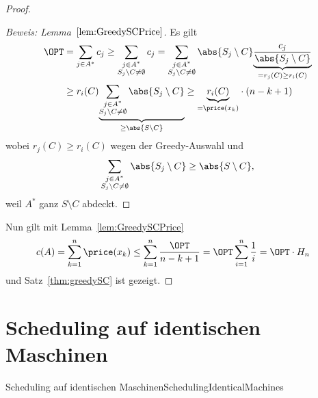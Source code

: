 \documentclass[language=ngerman,algolist]{TemplateLecture}
\begin{document}
\begin{proof}
\begin{proof}[Beweis: Lemma~$\ref{lem:GreedySCPrice}$]
        Es gilt 
        \begin{equation*}
            \begin{split}
                \OPT &= \sum_{j \in A^*} c_j \geq \sum_{\substack{j \in A^* \\ S_j \setminus C \neq \emptyset}} c_j = \sum_{\substack{j \in A^* \\ S_j \setminus C \neq \emptyset}} \abs{S_j \setminus C} \underset{=r_j(C) \geq r_i(C)}{\underbrace{\frac{c_j}{\abs{S_j \setminus C}}}}  \\
                &\geq r_i(C) \underset{\geq \abs{S \setminus C}}{\underbrace{\sum_{\substack{j \in A^* \\ S_j \setminus C \neq \emptyset}} \abs{S_j \setminus C}}} \geq \underset{=\price(x_k)}{\underbrace{r_i(C)}} \cdot (n-k+1)
            \end{split}
        \end{equation*}
        wobei $r_j(C) \geq r_i(C)$ wegen der Greedy-Auswahl und 
        \begin{equation*}
            \sum_{\substack{j \in A^* \\ S_j \setminus C \neq \emptyset}} \abs{S_j \setminus C} \geq \abs{S \setminus C},
        \end{equation*}
        weil $A^*$ ganz $S \setminus C$ abdeckt.
    \end{proof}
    Nun gilt mit Lemma~\ref{lem:GreedySCPrice}
    \begin{equation*}
        \begin{split}
            c(A) &= \sum_{k = 1}^n \price(x_k) \leq \sum_{k = 1}^n \frac{\OPT}{n-k+1} = \OPT\sum_{i=1}^n \frac{1}{i} = \OPT \cdot H_n
        \end{split}
    \end{equation*}
    und Satz~\ref{thm:greedySC} ist gezeigt.
\end{proof}

\section{Scheduling auf identischen Maschinen}
\begin{prob}{Scheduling auf identischen Maschinen}{SchedulingIdenticalMachines}
\end{prob}
\end{document}
